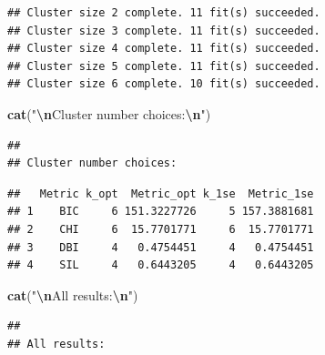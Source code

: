 \documentclass[12pt]{article}
\newenvironment{Shaded}{\begin{snugshade}}{\end{snugshade}}
\newcommand{\FunctionTok}[1]{\textcolor[rgb]{0.13,0.29,0.53}{\textbf{#1}}}
\newcommand{\NormalTok}[1]{#1}
\newcommand{\SpecialCharTok}[1]{\textcolor[rgb]{0.81,0.36,0.00}{\textbf{#1}}}
\newcommand{\StringTok}[1]{\textcolor[rgb]{0.31,0.60,0.02}{#1}}
\begin{document}
\begin{verbatim}
## Cluster size 2 complete. 11 fit(s) succeeded.
## Cluster size 3 complete. 11 fit(s) succeeded.
## Cluster size 4 complete. 11 fit(s) succeeded.
## Cluster size 5 complete. 11 fit(s) succeeded.
## Cluster size 6 complete. 10 fit(s) succeeded.
\end{verbatim}

\begin{Shaded}
\begin{Highlighting}[]
\FunctionTok{cat}\NormalTok{(}\StringTok{"}\SpecialCharTok{\textbackslash{}n}\StringTok{Cluster number choices:}\SpecialCharTok{\textbackslash{}n}\StringTok{"}\NormalTok{)}
\end{Highlighting}
\end{Shaded}

\begin{verbatim}
## 
## Cluster number choices:
\end{verbatim}

\begin{Shaded}
\end{Shaded}

\begin{verbatim}
##   Metric k_opt  Metric_opt k_1se  Metric_1se
## 1    BIC     6 151.3227726     5 157.3881681
## 2    CHI     6  15.7701771     6  15.7701771
## 3    DBI     4   0.4754451     4   0.4754451
## 4    SIL     4   0.6443205     4   0.6443205
\end{verbatim}

\begin{Shaded}
\begin{Highlighting}[]
\FunctionTok{cat}\NormalTok{(}\StringTok{"}\SpecialCharTok{\textbackslash{}n}\StringTok{All results:}\SpecialCharTok{\textbackslash{}n}\StringTok{"}\NormalTok{)}
\end{Highlighting}
\end{Shaded}

\begin{verbatim}
## 
## All results:
\end{verbatim}

\begin{Shaded}
\end{Shaded}
\end{document}

